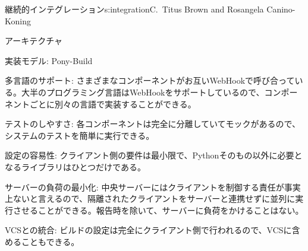 \begin{aosachapter}{継続的インテグレーション}{s:integration}{C.\ Titus Brown and Rosangela Canino-Koning}
\begin{aosasect1}{アーキテクチャ}
\begin{aosasect2}{実装モデル: Pony-Build}
\begin{aosadescription}
  \item{多言語のサポート:} さまざまなコンポーネントがお互いWebHookで呼び合っている。大半のプログラミング言語はWebHookをサポートしているので、コンポーネントごとに別々の言語で実装することができる。

  \item{テストのしやすさ:} 各コンポーネントは完全に分離していてモックがあるので、システムのテストを簡単に実行できる。

  \item{設定の容易性:} クライアント側の要件は最小限で、Pythonそのもの以外に必要となるライブラリはひとつだけである。

  \item{サーバーの負荷の最小化:} 中央サーバーにはクライアントを制御する責任が事実上ないと言えるので、隔離されたクライアントをサーバーと連携せずに並列に実行させることができる。報告時を除いて、サーバーに負荷をかけることはない。

  \item{VCSとの統合:} ビルドの設定は完全にクライアント側で行われるので、VCSに含めることもできる。


\end{aosadescription}
\end{aosasect2}
\end{aosasect1}
\end{aosachapter}

